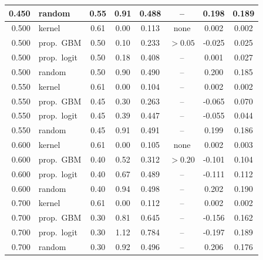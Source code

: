 \begin{tabular}{rlcccccc}
0.450 & random & 0.55 & 0.91 & 0.488 & -- & 0.198 & 0.189 \\
\midrule
0.500 & kernel & 0.61 & 0.00 & 0.113 & none & 0.002 & 0.002 \\
0.500 & prop.\ GBM & 0.50 & 0.10 & 0.233 & $>0.05$ & -0.025 & 0.025 \\
0.500 & prop.\ logit & 0.50 & 0.18 & 0.408 & -- & 0.001 & 0.027 \\
0.500 & random & 0.50 & 0.90 & 0.490 & -- & 0.200 & 0.185 \\
\midrule
0.550 & kernel & 0.61 & 0.00 & 0.104 & -- & 0.002 & 0.002 \\
0.550 & prop.\ GBM & 0.45 & 0.30 & 0.263 & -- & -0.065 & 0.070 \\
0.550 & prop.\ logit & 0.45 & 0.39 & 0.447 & -- & -0.055 & 0.044 \\
0.550 & random & 0.45 & 0.91 & 0.491 & -- & 0.199 & 0.186 \\
\midrule
0.600 & kernel & 0.61 & 0.00 & 0.105 & none & 0.002 & 0.003 \\
0.600 & prop.\ GBM & 0.40 & 0.52 & 0.312 & $>0.20$ & -0.101 & 0.104 \\
0.600 & prop.\ logit & 0.40 & 0.67 & 0.489 & -- & -0.111 & 0.112 \\
0.600 & random & 0.40 & 0.94 & 0.498 & -- & 0.202 & 0.190 \\
\midrule
0.700 & kernel & 0.61 & 0.00 & 0.112 & -- & 0.002 & 0.002 \\
0.700 & prop.\ GBM & 0.30 & 0.81 & 0.645 & -- & -0.156 & 0.162 \\
0.700 & prop.\ logit & 0.30 & 1.12 & 0.784 & -- & -0.197 & 0.189 \\
0.700 & random & 0.30 & 0.92 & 0.496 & -- & 0.206 & 0.176 \\
\bottomrule
\end{tabular}
